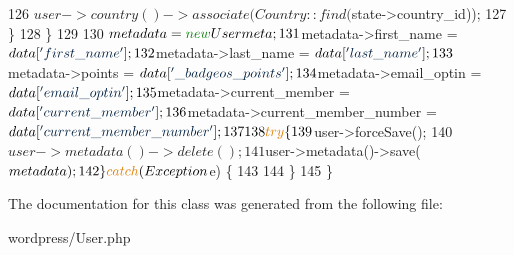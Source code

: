 \begin{DoxyCode}
126                 $user->country()->associate(Country::find($state->country\_id));
127             \}
128         \}
129 
130         $metadata                           = \textcolor{keyword}{new} Usermeta;
131         $metadata->first\_name               = $data[\textcolor{stringliteral}{'first\_name'}];
132         $metadata->last\_name                = $data[\textcolor{stringliteral}{'last\_name'}];
133         $metadata->points                   = $data[\textcolor{stringliteral}{'\_badgeos\_points'}];
134         $metadata->email\_optin              = $data[\textcolor{stringliteral}{'email\_optin'}];
135         $metadata->current\_member           = $data[\textcolor{stringliteral}{'current\_member'}];
136         $metadata->current\_member\_number    = $data[\textcolor{stringliteral}{'current\_member\_number'}];
137 
138         \textcolor{keywordflow}{try} \{
139             $user->forceSave();
140             $user->metadata()->delete();
141             $user->metadata()->save($metadata);
142         \} \textcolor{keywordflow}{catch}(Exception $e) \{
143 
144         \}
145     \}
\end{DoxyCode}


The documentation for this class was generated from the following file\-:\begin{DoxyCompactItemize}
\item 
wordpress/User.\-php\end{DoxyCompactItemize}

